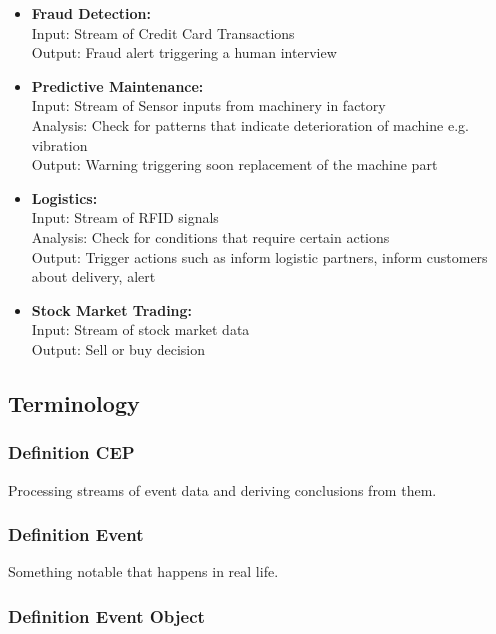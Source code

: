 \begin{itemize}
    \item \textbf{Fraud Detection:}\\
          Input: Stream of Credit Card Transactions\\
          Output: Fraud alert triggering a human interview
    \item \textbf{Predictive Maintenance:}\\
          Input: Stream of Sensor inputs from machinery in factory\\
          Analysis: Check for patterns that indicate deterioration of machine e.g. vibration\\
          Output: Warning triggering soon replacement of the machine part
    \item \textbf{Logistics:}\\
          Input: Stream of RFID signals\\
          Analysis: Check for conditions that require certain actions\\
          Output: Trigger actions such as inform logistic partners, inform customers about delivery, alert
    \item \textbf{Stock Market Trading:}\\
          Input: Stream of stock market data\\
          Output: Sell or buy decision
\end{itemize}

\subsection{Terminology}

\subsubsection*{Definition CEP}

Processing streams of event data and deriving conclusions from them.

\subsubsection*{Definition Event}

Something notable that happens in real life.

\subsubsection*{Definition Event Object}

